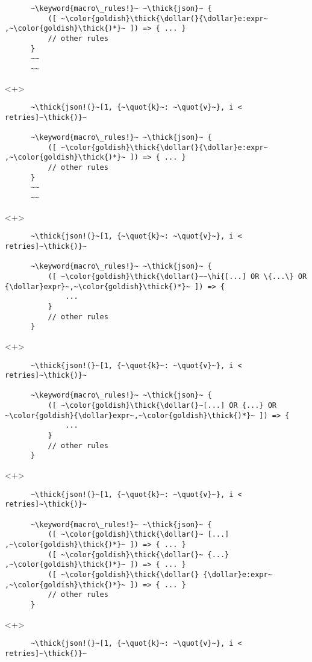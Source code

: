 \documentclass[usepdftitle=false,aspectratio=169]{beamer}
\newcommand{\dollar}{\makebox[\widthof{\$}][c]{\$}}
\newcommand{\thick}[1]{\contourlength{0.16pt}\contour[10]{black}{#1}}
\newcommand{\slantbox}[2][.5]
  {%
    \mbox
      {%
        \sbox{\foobox}{#2}%
        \hskip\wd\foobox
        \pdfsave
        \pdfsetmatrix{1 0 #1 1}%
        \llap{\usebox{\foobox}}%
        \pdfrestore
      }%
  }
\newcommand{\backslantbox}[2][.5]
  {%
    \mbox
      {%
        \sbox{\foobox}{#2}%
        \hskip\wd\foobox
        \pdfsave
        \pdfsetmatrix{-1 0 #1 1}%
        \llap{\usebox{\foobox}}%
        \pdfrestore
      }%
  }
\newcommand{\hi}[1]{%
\tikz[baseline=(A.base)]
 \node[highlighting=yellowbg,inner sep=0pt,text depth=0pt] (A) {#1};%
}
\newcommand{\openquote}{\backslantbox[.2]{\hspace{11pt}''\hspace{-11pt}}}
\newcommand{\closequote}{\slantbox[-.2]{\hspace{2pt}''\hspace{-2pt}}}
\newcommand{\blackquote}[1]{\openquote#1\closequote}
\newcommand{\quot}[1]{{\color{redish}\blackquote{#1}}}
\newcommand{\keyword}[1]{\color{greenish}#1}
\begin{document}
\begin{frame}[fragile]
\begin{onlyenv}
\begin{verbatim}
      ~\keyword{macro\_rules!}~ ~\thick{json}~ {
          ([ ~\color{goldish}\thick{\dollar(}{\dollar}e:expr~ ,~\color{goldish}\thick{)*}~ ]) => { ... }
          // other rules
      }
      ~~
      ~~
    \end{verbatim}
  \end{onlyenv}
  \begin{onlyenv}<+>
    \begin{verbatim}
      ~\thick{json!(}~[1, {~\quot{k}~: ~\quot{v}~}, i < retries]~\thick{)}~

      ~\keyword{macro\_rules!}~ ~\thick{json}~ {
          ([ ~\color{goldish}\thick{\dollar(}{\dollar}e:expr~ ,~\color{goldish}\thick{)*}~ ]) => { ... }
          // other rules
      }
      ~~
      ~~
    \end{verbatim}
  \end{onlyenv}
  \begin{onlyenv}<+>
    \begin{verbatim}
      ~\thick{json!(}~[1, {~\quot{k}~: ~\quot{v}~}, i < retries]~\thick{)}~

      ~\keyword{macro\_rules!}~ ~\thick{json}~ {
          ([ ~\color{goldish}\thick{\dollar(}~~\hi{[...] OR \{...\} OR {\dollar}expr}~,~\color{goldish}\thick{)*}~ ]) => {
              ...
          }
          // other rules
      }
    \end{verbatim}
  \end{onlyenv}
  \begin{onlyenv}<+>
    \begin{verbatim}
      ~\thick{json!(}~[1, {~\quot{k}~: ~\quot{v}~}, i < retries]~\thick{)}~

      ~\keyword{macro\_rules!}~ ~\thick{json}~ {
          ([ ~\color{goldish}\thick{\dollar(}~[...] OR {...} OR ~\color{goldish}{\dollar}expr~,~\color{goldish}\thick{)*}~ ]) => {
              ...
          }
          // other rules
      }
    \end{verbatim}
  \end{onlyenv}
  \begin{onlyenv}<+>
    \begin{verbatim}
      ~\thick{json!(}~[1, {~\quot{k}~: ~\quot{v}~}, i < retries]~\thick{)}~

      ~\keyword{macro\_rules!}~ ~\thick{json}~ {
          ([ ~\color{goldish}\thick{\dollar(}~ [...] ,~\color{goldish}\thick{)*}~ ]) => { ... }
          ([ ~\color{goldish}\thick{\dollar(}~ {...} ,~\color{goldish}\thick{)*}~ ]) => { ... }
          ([ ~\color{goldish}\thick{\dollar(} {\dollar}e:expr~ ,~\color{goldish}\thick{)*}~ ]) => { ... }
          // other rules
      }
    \end{verbatim}
  \end{onlyenv}
  \begin{onlyenv}<+>
    \begin{verbatim}
      ~\thick{json!(}~[1, {~\quot{k}~: ~\quot{v}~}, i < retries]~\thick{)}~


\end{verbatim}
\end{onlyenv}
\end{frame}
\end{document}
